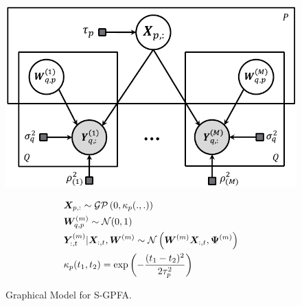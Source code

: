 \begin{figure}[t]
    \begin{minipage}{.5\textwidth}
        \centering
        \includegraphics[width=.75\linewidth]{figs/ch1/unfold_M.pdf}
        \caption{Graphical Model for S-GPFA.} \label{ch1:fig:model}
    \end{minipage}
    \begin{minipage}[c]{.5\textwidth}
        \savebox\strutbox{$\vphantom{\dfrac11}$}
        \begin{align*}
            & \bm{X}_{p, :} \sim \mathcal{GP}\left(0, \kappa_p(.,.) \right) \\
            & \bm{W}^{(m)}_{q,p} \sim \mathcal{N}(0, 1) \\
            & \bm{Y}^{(m)}_{:, t} | \bm{X}_{:, t}, \bm{W}^{(m)} \sim \mathcal{N} \left( \bm{W}^{(m)} \bm{X}_{:, t}, \bm{\Psi}^{(m)} \right) \\
            & \kappa_p(t_1, t_2) = \exp \left( -\frac{(t_1 - t_2)^2}{2\tau_p^2} \right)
        \end{align*}
  \end{minipage}
\end{figure}

